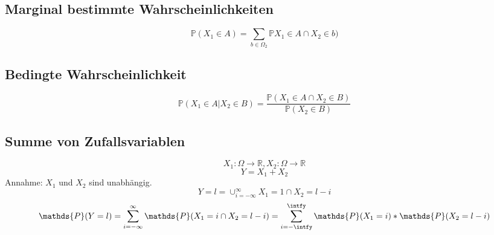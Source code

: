 \vspace{10pt}

\subsection *{Marginal bestimmte Wahrscheinlichkeiten}

\vspace{5pt}

\begin{equation*}
\mathds{P} ({X_{1} \in A } ) = \sum_{b \in \Omega_{2} } \mathds{P} {X_{1} \in A} \cap {X_{2} \in b})
\end{equation*}

\vspace{10pt}

\subsection *{Bedingte Wahrscheinlichkeit}

\vspace{5pt}

\begin{equation*}
\mathds{P} ({X_{1} \in A } | { X_{2} \in B } ) = \frac {\mathds{P} ( {X_{1} \in A } \cap {X_{2} \in B })} {\mathds{P} ({X_{2} \in B})}
\end{equation*}

\vspace{10pt}

\subsection *{Summe von Zufallsvariablen}

\vspace{5pt}
\begin{equation*}
X_{1}:\Omega \longrightarrow \mathds{R}, X_{2}:\Omega \longrightarrow \mathds{R}
\end{equation*}
\begin{equation*}
Y=X_{1}+X_{2}
\end{equation*}
\vspace{3pt}
Annahme: $X_{1}$ und $X_{2}$ sind unabh\"angig.\\
\begin{equation*}
{Y=l}=\cup_{i=-\infty}^{\infty} {X_{1}=1} \cap {X_{2}=l-i}
\end{equation*}
\vspace{3pt}
\begin{equation*}
\mathds{P} ({Y=l}) = \sum_{i=-\infty}^{\infty} \mathds{P} ({X_{1}=i} \cap {X_{2}=l-i}) = \sum_{i=-\intfy}^{\intfy} \mathds{P} ({X_{1} = i}) * \mathds{P} ({X_{2}=l-i})
\end{equation*}

